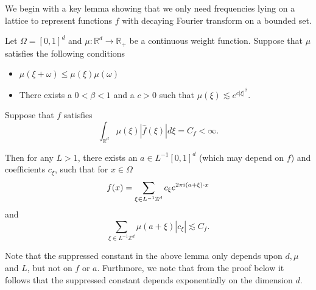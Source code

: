 We begin with a key lemma showing that we only need frequencies lying on a lattice to represent functions $f$ with decaying Fourier transform on a bounded set.
\begin{lemma}\label{fourier-representation-lemma-general}
 Let $\Omega=[0,1]^d$ and $\mu:\mathbb{R}^d\rightarrow \mathbb{R}_+$ be a continuous weight function. Suppose that $\mu$ satisfies the following conditions
 \begin{itemize}
  \item $\mu(\xi + \omega) \leq \mu(\xi)\mu(\omega)$
  \item There exists a $0 < \beta < 1$ and a $c > 0$ such that $\mu(\xi) \lesssim e^{c|\xi|^{\beta}}$.
 \end{itemize}

 Suppose that $f$ satisfies
 \begin{equation}
  \int_{\mathbb{R}^d} \mu(\xi)|\hat{f}(\xi)|d\xi = C_f < \infty.
 \end{equation}

 Then for any $L > 1$, there exists an $a\in L^{-1}[0,1]^d$ (which may depend on $f$) and coefficients $c_\xi$, such that for $x\in \Omega$
 \begin{equation}
  f(x) = \sum_{\xi\in L^{-1}\mathbb{Z}^d}c_\xi e^{2\pi {\mathrm{i}\mkern1mu}  (a+\xi)\cdot x}
 \end{equation}
 and
 \begin{equation}
  \sum_{\xi\in L^{-1}\mathbb{Z}^d} \mu(a+\xi)|c_\xi| \lesssim C_f.
 \end{equation}

\end{lemma}

Note that the suppressed constant in the above lemma only depends upon $d,\mu$ and $L$, but not on $f$ or $a$. Furthmore, we note that from the proof below it follows that the suppressed constant depends exponentially on the dimension $d$.

